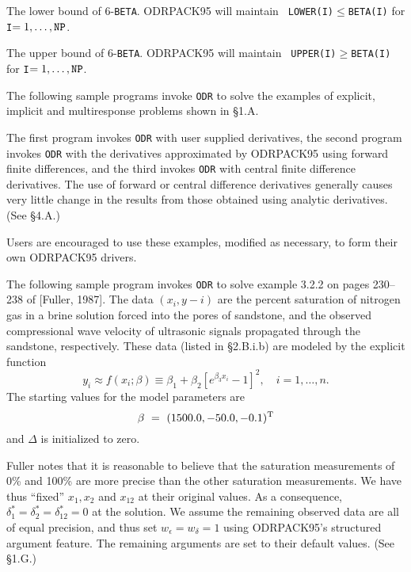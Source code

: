 \aligntobox The lower bound of 6-{\tt BETA}.  ODRPACK95 will maintain {\tt
LOWER(I)}$\le${\tt BETA(I)} for {\tt I}$= 1,\ldots,{\tt NP}$.


\aligntobox The upper bound of 6-{\tt BETA}.  ODRPACK95 will maintain {\tt
UPPER(I)}$\ge${\tt BETA(I)} for {\tt I}$= 1,\ldots,{\tt NP}$.

\bigskip{}\medskip

\noindent The following sample programs invoke {\tt ODR} to solve the examples of explicit, implicit and multiresponse problems shown in \S 1.A.

\noindent The first program invokes {\tt ODR} with user supplied derivatives,
the second program invokes {\tt ODR} with the derivatives approximated by
ODRPACK95 using forward finite differences, and the third invokes {\tt ODR} with central finite difference derivatives. The use of forward or central difference derivatives generally causes very little change in the results from those obtained using analytic derivatives. (See \S 4.A.)

\noindent Users are encouraged to use these examples, modified as necessary, to
form their own ODRPACK95 drivers. 

\bigskip{}
\medskip
\noindent The following sample program invokes {\tt ODR} to solve example 3.2.2 on pages 230--238 of [Fuller, 1987]. The data $(x_{i},y-{i})$ are the percent saturation of nitrogen gas in a brine solution forced into the pores of sandstone, and the observed compressional wave velocity of ultrasonic signals propagated through the sandstone, respectively. These data (listed in \S 2.B.i.b) are modeled by the explicit function
$$y_{i}\approx
f(x_{i};\beta)\equiv\beta_{1}+\beta_{2}[e^{\beta_{3}x_{i}}-1]^{2},\quad
i=1,\ldots,n.$$
The starting values for the model parameters are
$$\beta\ =\ (1500.0,-50.0,-0.1)^{\rm T}$$
and $\Delta$ is initialized to zero.

\noindent Fuller notes that it is reasonable to believe that the saturation measurements of 0\% and 100\% are more precise than the other saturation measurements. We have thus ``fixed'' $x_1,x_2$ and $x_{12}$ at their original values. As a consequence, $\delta_{1}^{*}=\delta_{2}^{*}=\delta_{12}^{*}=0$ at the solution. We assume the remaining observed data are all of equal precision, and thus set
$w_\epsilon=w_\delta=1$ using ODRPACK95's structured argument feature. The remaining arguments are set to their default values. (See \S 1.G.)

